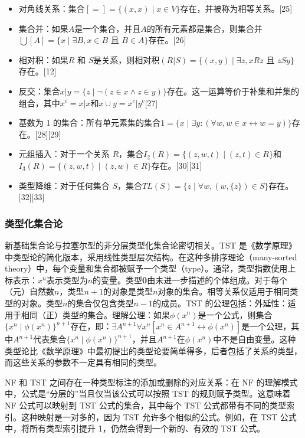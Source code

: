 \begin{itemize}
\item 对角线关系：集合\([=] = \{(x, x) \mid x \in V\}\)存在，并被称为相等关系。[25]
\item 集合并：如果\( A \)是一个集合，并且\( A \)的所有元素都是集合，则集合并\(\bigcup [A] = \{x \mid \exists B, x \in B \text{ 且 } B \in A\}\)存在。[26]
\item 相对积：如果\( R \) 和 \( S \)是关系，则相对积\((R | S) = \{(x, y) \mid \exists z, x R z \text{ 且 } z S y\}\)存在。[12]
\item 反交：集合\(x | y = \{z \mid \neg (z \in x \land z \in y)\}\)存在。这一运算等价于补集和并集的组合，其中\(x^c = x | x\)和\(x\cup y =x^c | y^c\)[27]
\item 基数为 1 的集合：所有单元素集的集合\(1 = \{x \mid \exists y : (\forall w, w \in x \leftrightarrow w = y)\}\)存在。[28][29]
\item 元组插入：对于一个关系 \( R \)，集合\(I_2(R) = \{(z, w, t) \mid (z, t) \in R\}\)和\(I_3(R) = \{(z, w, t) \mid (z, w) \in R\}\)存在。[30][31]
\item 类型降维：对于任何集合 \( S \)，集合\(TL(S) = \{z \mid \forall w, (w, \{z\}) \in S\}\)存在。[32][33]
\end{itemize}
\subsubsection{类型化集合论}
新基础集合论与拉塞尔型的非分层类型化集合论密切相关。TST 是《数学原理》中类型论的简化版本，采用线性类型层次结构。在这种多排序理论（many-sorted theory）中，每个变量和集合都被赋予一个类型（type）。通常，类型指数使用上标表示：\(x^n\)表示类型为\( n \)的变量。类型\textbf{0}由未进一步描述的个体组成。对于每个（元）自然数\( n \)，类型\( n+1 \)的对象是类型\( n \)对象的集合。相等关系仅适用于相同类型的对象。类型\( n \)的集合仅包含类型\( n-1 \)的成员。TST 的公理包括：外延性：适用于相同（正）类型的集合。理解公理：如果\( \phi(x^n) \)是一个公式，则集合\(\{x^n \mid \phi(x^n)\}^{n+1}\)存在，即：\(\exists A^{n+1}\forall x^n [x^n \in A^{n+1} \leftrightarrow \phi(x^n)]\)是一个公理，其中\( A^{n+1} \)代表集合\(\{x^n \mid \phi(x^n)\}^{n+1}\)，并且\( A^{n+1} \)在\( \phi(x^n) \)中不是自由变量。这种类型论比《数学原理》中最初提出的类型论要简单得多，后者包括了关系的类型，而这些关系的参数不一定具有相同的类型。

NF 和 TST 之间存在一种类型标注的添加或删除的对应关系：在 NF 的理解模式中，公式是“分层的”当且仅当该公式可以按照 TST 的规则赋予类型。这意味着 NF 公式可以映射到 TST 公式的集合，其中每个 TST 公式都带有不同的类型索引。这种映射是一对多的，因为 TST 允许多个相似的公式。例如，在 TST 公式中，将所有类型索引提升 1，仍然会得到一个新的、有效的 TST 公式。
